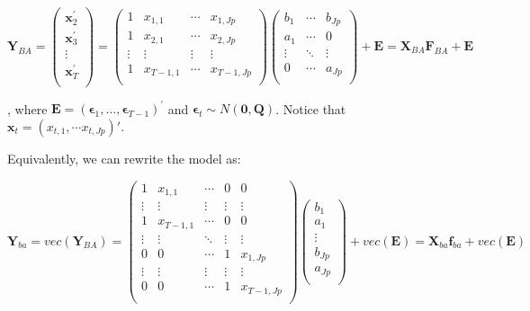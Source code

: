 \documentclass[]{article}
\begin{document}
\[\mathbf{Y}_{BA} = \begin{pmatrix}
	\mathbf{x}_{2}^{'} \\
	\mathbf{x}_{3}^{'} \\
	\vdots \\
	\mathbf{x}_{T}^{'} \\
\end{pmatrix} = \begin{pmatrix}
	1 & x_{1,1} & \cdots & x_{1,Jp} \\
	1 & x_{2,1} & \cdots & x_{2,Jp} \\
	\vdots & \vdots & \vdots & \vdots \\
	1 & x_{T - 1,1} & \cdots & x_{T - 1,Jp} \\
\end{pmatrix}\begin{pmatrix}
	b_{1} & \cdots & b_{Jp} \\
	a_{1} & \cdots & 0 \\
	\vdots & \ddots & \vdots \\
	0 & \cdots & a_{Jp} \\
\end{pmatrix} + \mathbf{E} = \mathbf{X}_{BA}\mathbf{F}_{BA} + \mathbf{E}\]

, where
\(\mathbf{E} = \left( \bm{\epsilon}_{1},\ldots,\bm{\epsilon}_{T - 1} \right)^{'}\)
and \(\bm{\epsilon}_{t} \sim N(\mathbf{0},\mathbf{Q})\). Notice that
\(\mathbf{x}_{t} = (x_{t, 1}, \cdots x_{t, Jp})'\).

Equivalently, we can rewrite the model as:

\[\mathbf{Y}_{ba} = vec\left(\mathbf{Y}_{BA} \right) = \begin{pmatrix}
	1 & x_{1,1} & \cdots & 0 & 0 \\
	\vdots & \vdots & \vdots & \vdots & \vdots \\
	1 & x_{T - 1,1} & \cdots & 0 & 0 \\
	\vdots & \vdots & \ddots & \vdots & \vdots \\
	0 & 0 & \cdots & 1 & x_{1,Jp} \\
	\vdots & \vdots & \vdots & \vdots & \vdots \\
	0 & 0 & \cdots & 1 & x_{T - 1,Jp} \\
\end{pmatrix}\begin{pmatrix}
	b_{1} \\
	a_{1} \\
	\vdots \\
	b_{Jp} \\
	a_{Jp} \\
\end{pmatrix} + vec(\mathbf{E}) = \mathbf{X}_{ba}\mathbf{f}_{ba} + vec(\mathbf{E})\]
\end{document}
